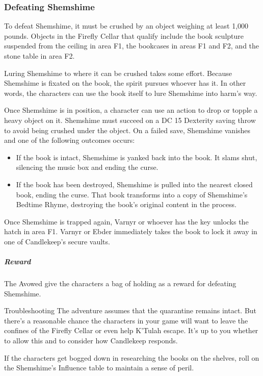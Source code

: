 \documentclass[10pt,a4paper,twoside,bg=print,twocolumn,openany,nodeprecatedcode]{dndbook}
\begin{document}
\subsubsection{Defeating Shemshime}
To defeat Shemshime, it must be crushed by an object weighing at least 1,000 pounds. Objects in the Firefly Cellar that qualify include the book sculpture suspended from the ceiling in area F1, the bookcases in areas F1 and F2, and the stone table in area F2.

Luring Shemshime to where it can be crushed takes some effort. Because Shemshime is fixated on the book, the spirit pursues whoever has it. In other words, the characters can use the book itself to lure Shemshime into harm's way.

Once Shemshime is in position, a character can use an action to drop or topple a heavy object on it. Shemshime must succeed on a DC 15 Dexterity saving throw to avoid being crushed under the object. On a failed save, Shemshime vanishes and one of the following outcomes occurs:


\begin{itemize}
\item If the book is intact, Shemshime is yanked back into the book. It slams shut, silencing the music box and ending the curse.
\item If the book has been destroyed, Shemshime is pulled into the nearest closed book, ending the curse. That book transforms into a copy of Shemshime's Bedtime Rhyme, destroying the book's original content in the process.
\end{itemize}

Once Shemshime is trapped again, Varnyr or whoever has the key unlocks the hatch in area F1. Varnyr or Ebder immediately takes the book to lock it away in one of Candlekeep's secure vaults.

\subparagraph{Reward}
The Avowed give the characters a bag of holding as a reward for defeating Shemshime.

\begin{DndSidebar}[float=!b]{Troubleshooting}
The adventure assumes that the quarantine remains intact. But there's a reasonable chance the characters in your game will want to leave the confines of the Firefly Cellar or even help K'Tulah escape. It's up to you whether to allow this and to consider how Candlekeep responds.



If the characters get bogged down in researching the books on the shelves, roll on the Shemshime's Influence table to maintain a sense of peril.



\end{DndSidebar}
\end{document}
